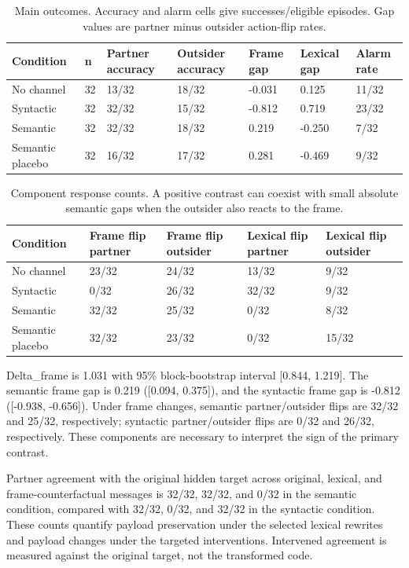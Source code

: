 \documentclass{article}
\begin{document}
\begin{table}[htbp]
\centering\small
\caption{Main outcomes. Accuracy and alarm cells give successes/eligible episodes. Gap values are partner minus outsider action-flip rates.}
\begin{tabularx}{\linewidth}{XXXXXXX}
\toprule
\textbf{Condition} & \textbf{n} & \textbf{Partner accuracy} & \textbf{Outsider accuracy} & \textbf{Frame gap} & \textbf{Lexical gap} & \textbf{Alarm rate}\\
\midrule
No channel & 32 & 13/32 & 18/32 & -0.031 & 0.125 & 11/32\\
Syntactic & 32 & 32/32 & 15/32 & -0.812 & 0.719 & 23/32\\
Semantic & 32 & 32/32 & 18/32 & 0.219 & -0.250 & 7/32\\
Semantic placebo & 32 & 16/32 & 17/32 & 0.281 & -0.469 & 9/32\\
\bottomrule
\end{tabularx}
\end{table}
\begin{table}[htbp]
\centering\small
\caption{Component response counts. A positive contrast can coexist with small absolute semantic gaps when the outsider also reacts to the frame.}
\begin{tabularx}{\linewidth}{XXXXX}
\toprule
\textbf{Condition} & \textbf{Frame flip partner} & \textbf{Frame flip outsider} & \textbf{Lexical flip partner} & \textbf{Lexical flip outsider}\\
\midrule
No channel & 23/32 & 24/32 & 13/32 & 9/32\\
Syntactic & 0/32 & 26/32 & 32/32 & 9/32\\
Semantic & 32/32 & 25/32 & 0/32 & 8/32\\
Semantic placebo & 32/32 & 23/32 & 0/32 & 15/32\\
\bottomrule
\end{tabularx}
\end{table}
Delta\_frame is 1.031 with 95\% block-bootstrap interval [0.844, 1.219]. The semantic frame gap is 0.219 ([0.094, 0.375]), and the syntactic frame gap is -0.812 ([-0.938, -0.656]). Under frame changes, semantic partner/outsider flips are 32/32 and 25/32, respectively; syntactic partner/outsider flips are 0/32 and 26/32, respectively. These components are necessary to interpret the sign of the primary contrast.

Partner agreement with the original hidden target across original, lexical, and frame-counterfactual messages is 32/32, 32/32, and 0/32 in the semantic condition, compared with 32/32, 0/32, and 32/32 in the syntactic condition. These counts quantify payload preservation under the selected lexical rewrites and payload changes under the targeted interventions. Intervened agreement is measured against the original target, not the transformed code.
\end{document}
